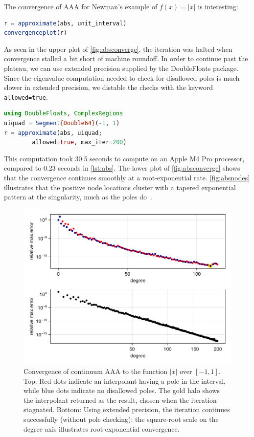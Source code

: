 \documentclass{juliacon}
\begin{document}
The convergence of AAA for Newman's example of $f(x)=|x|$ is interesting:
\begin{lstlisting}[language = Julia, caption={Continuum AAA for $|x|$.}, label={lst:abs}]
r = approximate(abs, unit_interval)
convergenceplot(r)
\end{lstlisting}
As seen in the upper plot of \autoref{fig:absconverge}, the iteration was halted when convergence stalled a bit short of machine roundoff. In order to continue past the plateau, we can use extended precision supplied by the \textsf{DoubleFloats} package. Since the eigenvalue computation needed to check for disallowed poles is much slower in extended precision, we distable the checks with the keyword \verb|allowed=true|. 
\begin{lstlisting}[language = Julia, caption={Continuum AAA in extended precision.}, label={lst:absquad}]
using DoubleFloats, ComplexRegions
uiquad = Segment{Double64}(-1, 1)
r = approximate(abs, uiquad; 
        allowed=true, max_iter=200)
\end{lstlisting}
This computation took 30.5 seconds to compute on an Apple M4 Pro processor, compared to 0.23 seconds in \autoref{lst:abs}. The lower plot of \autoref{fig:absconverge} shows that the convergence continues smoothly at a root-exponential rate. \autoref{fig:absnodes} illustrates that the positive node locations cluster with a tapered exponential pattern at the singularity, much as the poles do~\cite{trefethenExponentialNode2021}. 

\begin{figure}
\centering
\includegraphics[width=\columnwidth]{absconverge.pdf}
\caption{Convergence of continuum AAA to the function $|x|$ over $[-1,1]$. Top: Red dots indicate an interpolant having a pole in the interval, while blue dots indicate no disallowed poles. The gold halo shows the interpolant returned as the result, chosen when the iteration stagnated. Bottom: Using extended precision, the iteration continues successfully (without pole checking); the square-root scale on the degree axis illustrates root-exponential convergence.}
\label{fig:absconverge}
\end{figure}
\end{document}
